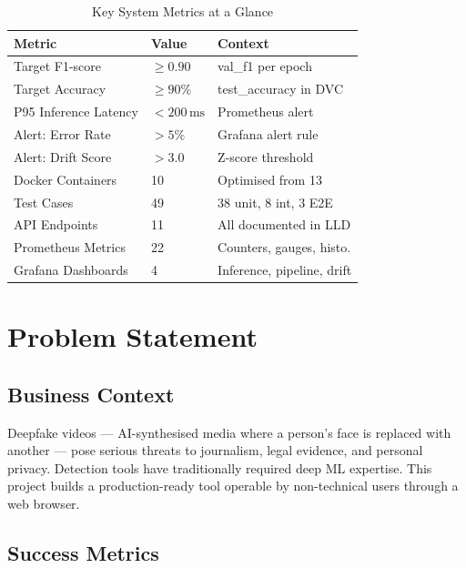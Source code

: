\documentclass[conference]{IEEEtran}
\begin{document}
\begin{table}[H]
\centering
\caption{Key System Metrics at a Glance}
\label{tab:metrics}
\begin{tabular}{@{}lll@{}}
\toprule
\textbf{Metric} & \textbf{Value} & \textbf{Context} \\
\midrule
Target F1-score         & $\geq 0.90$   & val\_f1 per epoch \\
Target Accuracy         & $\geq 90\%$   & test\_accuracy in DVC \\
P95 Inference Latency   & $< 200\,\text{ms}$ & Prometheus alert \\
Alert: Error Rate       & $> 5\%$       & Grafana alert rule \\
Alert: Drift Score      & $> 3.0$       & Z-score threshold \\
Docker Containers       & 10            & Optimised from 13 \\
Test Cases              & 49            & 38 unit, 8 int, 3 E2E \\
API Endpoints           & 11            & All documented in LLD \\
Prometheus Metrics      & 22            & Counters, gauges, histo. \\
Grafana Dashboards      & 4             & Inference, pipeline, drift \\
\bottomrule
\end{tabular}
\end{table}

\section{Problem Statement}
\label{sec:problem}

\subsection{Business Context}

Deepfake videos — AI-synthesised media where a person's face is replaced with another — pose serious threats to journalism, legal evidence, and personal privacy. Detection tools have traditionally required deep ML expertise. This project builds a production-ready tool operable by non-technical users through a web browser.

\subsection{Success Metrics}
\end{document}
